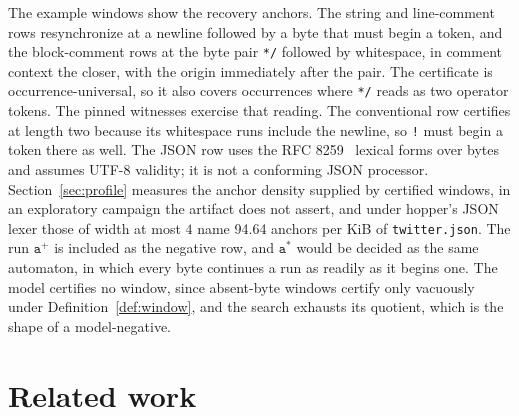 \documentclass[11pt,a4paper]{article}
\theoremstyle{definition}
\theoremstyle{plain}
\newcommand{\code}[1]{\texttt{#1}}
\begin{document}
The example windows show the recovery anchors. The string and line-comment rows resynchronize at a newline followed by a
byte that must begin a token, and the block-comment rows at the byte pair \code{*/} followed by whitespace, in comment
context the closer, with the origin immediately after the pair. The certificate is occurrence-universal, so it also
covers occurrences where \code{*/} reads as two operator tokens. The pinned witnesses exercise that reading. The
conventional row certifies at length two because its whitespace runs include the newline, so \code{!} must begin a token
there as well. The JSON row uses the RFC 8259~\cite{bray2017json} lexical forms over bytes and assumes UTF-8 validity;
it is not a conforming JSON processor. Section~\ref{sec:profile} measures the anchor density supplied by certified
windows, in an exploratory campaign the artifact does not assert, and under hopper's JSON lexer those of width at most
$4$ name 94.64 anchors per KiB of \code{twitter.json}. The run $\code{a}^+$ is included as the negative row, and
$\code{a}^*$ would be decided as the same automaton, in which every byte continues a run as readily as it begins one.
The model certifies no window, since absent-byte windows certify only vacuously under Definition~\ref{def:window}, and
the search exhausts its quotient, which is the shape of a model-negative.

\section{Related work}
\label{sec:related}
\end{document}
